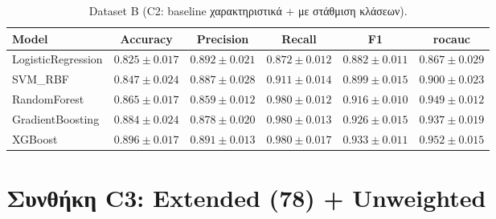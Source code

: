 \begin{table}[H]
    \centering
    \caption{Dataset B (C2: baseline χαρακτηριστικά + με στάθμιση κλάσεων).}
    \label{tab:appendix-c2-dataset-b}
    \scriptsize
    \begin{tabular}{@{}lccccc@{}}
        \toprule
        Model & Accuracy & Precision & Recall & F1 & \gls{rocauc} \\
        \midrule
        LogisticRegression & $0.825 \pm 0.017$ & $0.892 \pm 0.021$ & $0.872 \pm 0.012$ & $0.882 \pm 0.011$ & $0.867 \pm 0.029$ \\
        SVM\_RBF & $0.847 \pm 0.024$ & $0.887 \pm 0.028$ & $0.911 \pm 0.014$ & $0.899 \pm 0.015$ & $0.900 \pm 0.023$ \\
        RandomForest & $0.865 \pm 0.017$ & $0.859 \pm 0.012$ & $0.980 \pm 0.012$ & $0.916 \pm 0.010$ & $0.949 \pm 0.012$ \\
        GradientBoosting & $0.884 \pm 0.024$ & $0.878 \pm 0.020$ & $0.980 \pm 0.013$ & $0.926 \pm 0.015$ & $0.937 \pm 0.019$ \\
        XGBoost & $0.896 \pm 0.017$ & $0.891 \pm 0.013$ & $0.980 \pm 0.017$ & $0.933 \pm 0.011$ & $0.952 \pm 0.015$ \\
        \bottomrule
    \end{tabular}
\end{table}

\section{Συνθήκη C3: Extended (78) + Unweighted}

